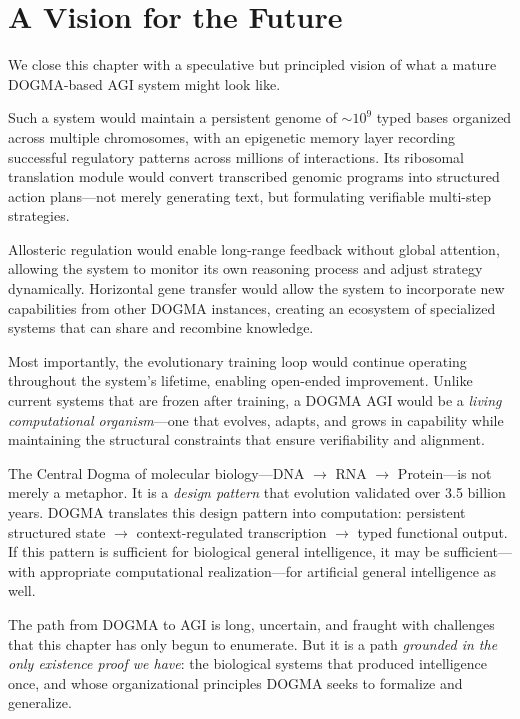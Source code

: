 \section{A Vision for the Future}
\label{sec:vision}

We close this chapter with a speculative but principled vision of what a mature DOGMA-based AGI system might look like.

Such a system would maintain a persistent genome of $\sim\!10^9$ typed bases organized across multiple chromosomes, with an epigenetic memory layer recording successful regulatory patterns across millions of interactions. Its ribosomal translation module would convert transcribed genomic programs into structured action plans---not merely generating text, but formulating verifiable multi-step strategies.

Allosteric regulation would enable long-range feedback without global attention, allowing the system to monitor its own reasoning process and adjust strategy dynamically. Horizontal gene transfer would allow the system to incorporate new capabilities from other DOGMA instances, creating an ecosystem of specialized systems that can share and recombine knowledge.

Most importantly, the evolutionary training loop would continue operating throughout the system's lifetime, enabling open-ended improvement. Unlike current systems that are frozen after training, a DOGMA AGI would be a \emph{living computational organism}---one that evolves, adapts, and grows in capability while maintaining the structural constraints that ensure verifiability and alignment.

\begin{bioinsight}
The Central Dogma of molecular biology---DNA $\to$ RNA $\to$ Protein---is not merely a metaphor. It is a \emph{design pattern} that evolution validated over 3.5 billion years. DOGMA translates this design pattern into computation: persistent structured state $\to$ context-regulated transcription $\to$ typed functional output. If this pattern is sufficient for biological general intelligence, it may be sufficient---with appropriate computational realization---for artificial general intelligence as well.
\end{bioinsight}

The path from DOGMA to AGI is long, uncertain, and fraught with challenges that this chapter has only begun to enumerate. But it is a path \emph{grounded in the only existence proof we have}: the biological systems that produced intelligence once, and whose organizational principles DOGMA seeks to formalize and generalize.

